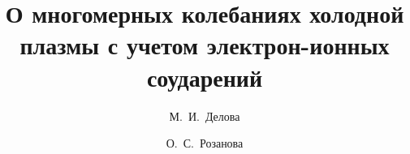 

\usepackage{todonotes} %

\usepackage[russian]{nla}

%
%


%

\usepackage{bm}
\def\dfrac#1#2{\displaystyle{#1\over #2}}
\def\Div{\mbox{div}\,}
\def\bB{{\bf B}}
\def\bx{{\bf x}}
\def\bE{{\bf E}}
\def\bv{{\bf v}}
\def\br{{\bf r}}
\def\bp{{\bf p}}
\def\bV{{\bf V}}

\fi




%

%

\title{О многомерных колебаниях холодной  плазмы с учетом электрон-ионных соударений}
\author{М.~И.~Делова  %
  \and  %
  О.~С.~Розанова
} %


